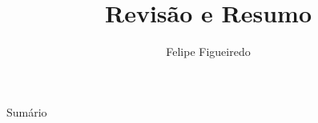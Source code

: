 \documentclass{beamer}
\title%
{Revisão e Resumo}
\subtitle
{} %
\author%
{Felipe Figueiredo}%
\institute[UNIAN] %
{Centro Universitário Anhanguera de Niterói - UNIAN
}
\date%
{}
\begin{document}
\begin{frame}
  \titlepage
\end{frame}

\begin{frame}{Sumário}
  \tableofcontents
\end{frame}







\end{document}
